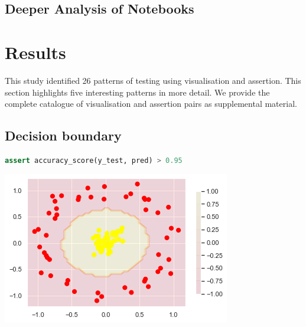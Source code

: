 \documentclass[acmsmall,screen,review,anonymous]{acmart}
\begin{document}
\subsection{Deeper Analysis of Notebooks}\label{sec:deep-dive}

\section{Results}\label{sec:result}
This study identified 26 patterns of testing using visualisation and
assertion. This section highlights five interesting patterns in more
detail. We provide the complete catalogue of visualisation and
assertion pairs as supplemental material.

\subsection{Decision boundary}\label{sec:svm}

\begin{minipage}{0.5\textwidth}
  \begin{lstlisting}[language=Python, caption=Assertion on the accuracy of the ML model.]
assert accuracy_score(y_test, pred) > 0.95
  \end{lstlisting}
  \label{lst:svm}
\end{minipage}
\begin{minipage}{0.5\textwidth}
  \includegraphics[width=\linewidth]{../catalogue/select-04.png}
  \label{fig:svm}
\end{minipage}
\end{document}
